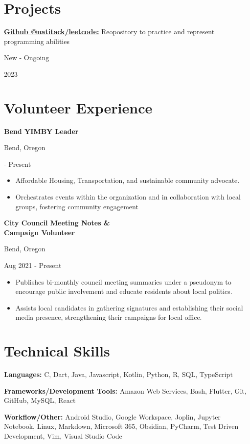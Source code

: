 \documentclass[10pt]{article}
\newcommand{\triline}[3]{%
    \parbox[t][][t]{.4\linewidth}{ #1 }%
    \parbox[t][][t]{.4\linewidth}{ #2 }%
    \parbox[t][][t]{.2\linewidth}{\raggedleft #3 }%
    \vspace{1ex}
}
\newcommand{\publication}[3]{%
    \parbox[t][][t]{.8\linewidth}{ #1 }%
    \parbox[t][][t]{.05\linewidth}{ #2 }%
    \parbox[t][][t]{.15\linewidth}{\raggedright #3 }%
    \vspace{0.5ex}
}
\newlength{\listpostvertical}
\begin{document}
\section{Projects}

\publication%
    {
    \textbf{ 
    \href{https://github.com/natitack/leetcode}%
          {Github @natitack/leetcode:}} Reopository to practice and represent programming abilities}%

    {New - Ongoing}%
    {2023}

    \section{Volunteer Experience}

    \triline{\textbf{Bend YIMBY Leader}}{Bend, Oregon}{2021 - Present}
    \begin{itemize}[nosep]
    \item Affordable Housing, Transportation, and sustainable community advocate. 
    \item Orchestrates events within the organization and in collaboration with local groups, fostering community engagement
    
    \end{itemize}
    \vspace{\listpostvertical}
    
    \triline{\textbf{City Council Meeting Notes \& \\ Campaign Volunteer}}{Bend, Oregon}{ Aug 2021 - Present}
    \vspace{\listpostvertical}
    
    \begin{itemize}[nosep]
    \item Publishes bi-monthly council meeting summaries under a pseudonym to encourage public involvement and educate residents about local politics.

    \item Assists local candidates in gathering signatures and establishing their social media presence, strengthening their campaigns for local office.
    \end{itemize}

\section{Technical Skills}

\begin{trivlist}
    \item \textbf{Languages:}  C, Dart, Java, Javascript, Kotlin, Python, R, SQL, TypeScript
    \item \textbf{Frameworks/Development Tools:} Amazon Web Services, Bash, Flutter, Git, GitHub, MySQL, React
    \item \textbf{Workflow/Other:} Android Studio, Google Workspace, Joplin, Jupyter Notebook, Linux, Markdown, Microsoft 365, Obsidian, PyCharm, Test Driven Development, 
    Vim, Visual Studio Code
\end{trivlist}
\end{document}

